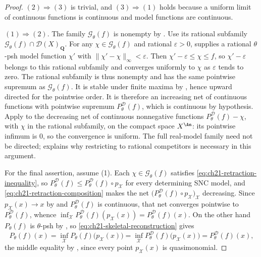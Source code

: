 \begin{proof}
$(2)\Rightarrow(3)$ is trivial, and $(3)\Rightarrow(1)$ holds because a
uniform limit of continuous functions is continuous and model functions are
continuous.

$(1)\Rightarrow(2)$.  The family $\mathcal G_\theta(f)$ is nonempty by
.  Use its rational subfamily
$\mathcal G_\theta(f)\cap\mathcal D(X)_{\mathbf Q}$.
For any $\chi\in\mathcal G_\theta(f)$ and rational $\varepsilon>0$,
 supplies a rational
$\theta$-psh model function $\chi'$ with
$\|\chi'-\chi\|_\infty<\varepsilon$.  Then
$\chi'-\varepsilon\leq\chi\leq f$, so $\chi'-\varepsilon$ belongs
to this rational subfamily and converges uniformly to $\chi$ as
$\varepsilon$ tends to zero.  The rational subfamily is thus nonempty
and has the same pointwise supremum as $\mathcal G_\theta(f)$.
It is stable under finite maxima by , hence
upward directed for the pointwise order.  It is therefore an increasing
net of continuous functions with pointwise
supremum $P^{\mathcal D}_\theta(f)$, which is continuous by hypothesis.
Apply  to the decreasing net of continuous nonnegative
functions $P^{\mathcal D}_\theta(f)-\chi$, with $\chi$ in the rational
subfamily,
on the compact space $X^{\An}$: its pointwise infimum is $0$, so the
convergence is uniform.  The full real-model family need not be directed;
 explains why restricting
to rational competitors is necessary in this argument.

For the final assertion, assume (1).  Each $\chi\in\mathcal G_\theta(f)$
satisfies \eqref{eq:ch21-retraction-inequality}, so
$P^{\mathcal D}_\theta(f)\leq P^{\mathcal D}_\theta(f)\circ p_{\mathcal X}$
for every determining SNC model, and
\eqref{eq:ch21-retraction-composition} makes the net
$\bigl(P^{\mathcal D}_\theta(f)\circ p_{\mathcal X}\bigr)_{\mathcal X}$
decreasing.  Since $p_{\mathcal X}(x)\to x$ by
 and $P^{\mathcal D}_\theta(f)$ is
continuous, that net converges pointwise to
$P^{\mathcal D}_\theta(f)$, whence
$\inf_{\mathcal X}P^{\mathcal D}_\theta(f)(p_{\mathcal X}(x))
=P^{\mathcal D}_\theta(f)(x)$.  On the other hand $P_\theta(f)$ is
$\theta$-psh by , so
\eqref{eq:ch21-skeletal-reconstruction} gives
\[
 P_\theta(f)(x)
 =\inf_{\mathcal X}P_\theta(f)\bigl(p_{\mathcal X}(x)\bigr)
 =\inf_{\mathcal X}P^{\mathcal D}_\theta(f)\bigl(p_{\mathcal X}(x)\bigr)
 =P^{\mathcal D}_\theta(f)(x),
\]
the middle equality by , since every
point $p_{\mathcal X}(x)$ is quasimonomial.
\end{proof}

